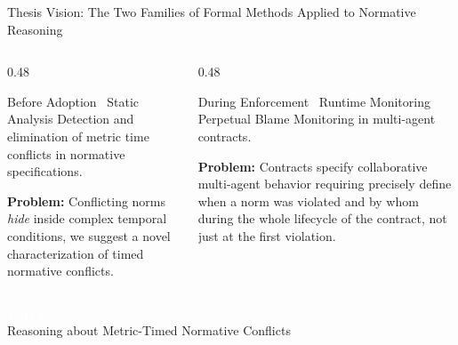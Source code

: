 \documentclass[9pt,aspectratio=169]{beamer}
\newcommand{\logic}[1]{\ensuremath{\mathsf{#1}}\xspace}
\newcommand{\TDDLfm}{\logic{\mu MTNL}}
\begin{document}
\begin{frame}{Thesis Vision: The Two Families of Formal Methods Applied to Normative Reasoning}

\centering
{}
\vspace{-3mm}
\begin{columns}[T]
  \begin{column}{0.48\textwidth}
    \begin{block}{Before Adoption \textemdash\ Static Analysis}
      \small
      Detection and elimination of metric time conflicts in normative specifications.
    \medskip

      \textbf{Problem:}  Conflicting norms \emph{hide} inside complex temporal conditions, we suggest a novel characterization of timed normative conflicts.
    \end{block}
  \end{column}
  \begin{column}{0.48\textwidth}
    \begin{block}{During Enforcement \textemdash\ Runtime Monitoring}
      \small
     Perpetual Blame Monitoring  in multi-agent contracts.
      
      \medskip

      \textbf{Problem:}  Contracts specify collaborative multi-agent behavior requiring precisely define when a norm was violated and by whom
         during the whole lifecycle of the contract, not just at the first violation.
  
    \end{block}
  \end{column}
\end{columns}
\end{frame}

{
\begin{frame}[plain]
  \vfill
  \centering
  \textcolor{white}{\Huge\bfseries Part I}\\[6mm]
  \textcolor{white!85}{\Large Reasoning about Metric-Timed Normative Conflicts }\\[3mm]
  \vfill
\end{frame}
}
\end{document}
